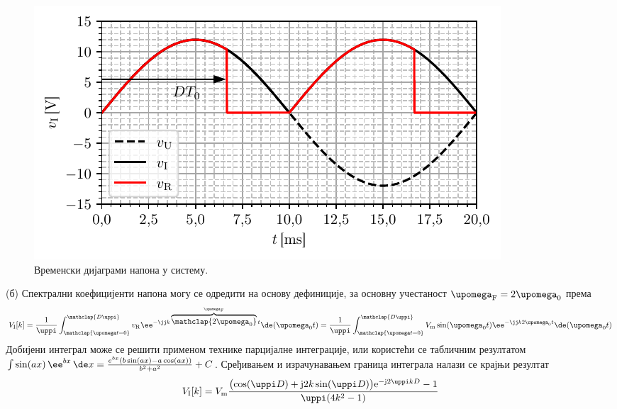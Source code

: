 \begin{figure}[ht!]
    \centering
    \includegraphics{fig/THD_vi_vr.pdf}
    \caption{Временски дијаграми напона у систему.}
    \label{fig:\ID.vivr}
\end{figure}

(б) Спектрални коефицијенти напона могу се одредити на основу дефиниције, за основну учестаност 
$\upomega_{\rm F} = 2\upomega_0$ према 
\begin{equation}
    V_{\rm I}[k] = \dfrac{1}{\uppi} \int_{\mathclap{\upomega t = 0}}^{\mathclap{D\uppi}} v_{\rm R} \ee^{-\jj k \overbrace{\mathclap{2\upomega_{\rm 0}}}^{\upomega_{\rm F}} t} \de(\upomega_0 t) 
    = \dfrac{1}{\uppi} \int_{\mathclap{\upomega t = 0}}^{\mathclap{D\uppi}} V_{\rm m} \sin(\upomega_0 t) \ee^{-\jj k {2\upomega_{\rm 0} } t} \de(\upomega_0 t) 
\end{equation}
Добијени интеграл може се решити применом технике парцијалне интеграције, или користећи се табличним резултатом 
$\int \sin(ax) \, \ee^{bx} \, \de x = 
{{e^{b x} \left(b \sin \left(a x\right)-a \cos \left(a x\right)\right)}\over{b^2+a^2}} + C$. Сређивањем и израчунавањем граница интеграла
налази се крајњи резултат
\begin{equation}
V_{\rm I}[k] = {V_{\rm m}}
\dfrac{
\bigl(
\cos(\uppi D) + 
{\rm j}2k \sin(\uppi D) 
\bigr)
{\rm e}^{-{\rm j}2\uppi kD }
-1 }{\uppi(4k^2 - 1)}
\end{equation}


